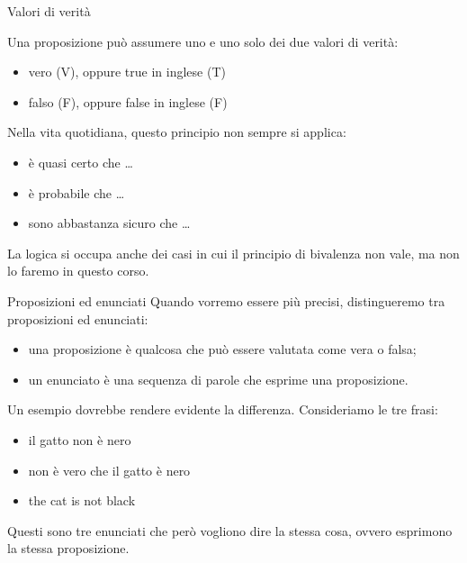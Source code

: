 \documentclass[aspectratio=169,10pt,dvipsnames,handout]{beamer}
\begin{document}
\begin{frame}{Valori di verità}
	\begin{definition}
		Una proposizione può assumere uno e uno solo dei due \alert{valori di verità}:
		\begin{itemize}
			\item vero (\alert{V}), oppure true in inglese (\alert{T})
			\item falso (\alert{F}), oppure false in inglese (\alert{F})
		\end{itemize}
	\end{definition}
	Nella vita quotidiana, questo principio non sempre si applica:
	\begin{itemize}
		\item è quasi certo che \ldots
		\item è probabile che \ldots
		\item sono abbastanza sicuro che \ldots
	\end{itemize}
	La logica si occupa anche dei casi in cui il principio di bivalenza non vale, ma non lo faremo in questo corso.
\end{frame}

\begin{frame}{Proposizioni ed enunciati}
	Quando vorremo essere più precisi, distingueremo tra \alert{proposizioni} ed \alert{enunciati}:
	\begin{itemize}
		\item una proposizione è qualcosa che può essere valutata come vera o falsa;
		\item un enunciato è una sequenza di parole che esprime una proposizione.
	\end{itemize}

	\medskip
	Un esempio dovrebbe rendere evidente la differenza. Consideriamo le tre frasi:
	\begin{itemize}
	\item il gatto non è nero
	\item non è vero che il gatto è nero
	\item the cat is not black
	\end{itemize}
	Questi sono tre enunciati che però vogliono dire la stessa cosa, ovvero esprimono la stessa proposizione.
\end{frame}
\end{document}
